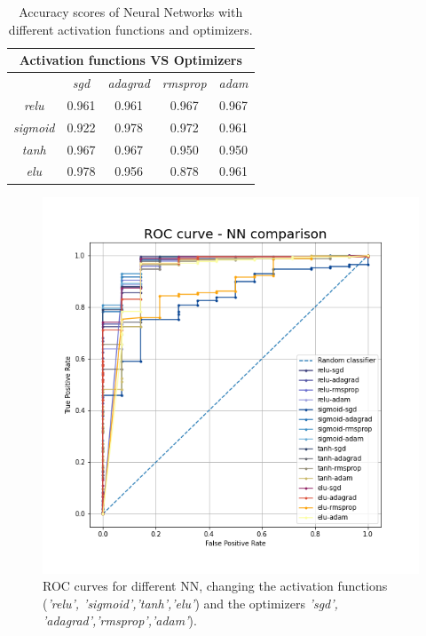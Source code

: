 \documentclass[english,notitlepage,reprint,nofootinbib]{revtex4-1}  %
\begin{document}
\begin{table}[]
\begin{tabular}{ccccc}
\hline
\multicolumn{5}{c}{Activation functions VS Optimizers}                                                     \\ \hline
                                      & \textit{sgd} & \textit{adagrad} & \textit{rmsprop} & \textit{adam} \\ \cline{2-5} 
\multicolumn{1}{c|}{\textit{relu}}    & 0.961        & 0.961            & 0.967            & 0.967         \\
\multicolumn{1}{c|}{\textit{sigmoid}} & 0.922        & 0.978            & 0.972            & 0.961         \\
\multicolumn{1}{c|}{\textit{tanh}}    & 0.967        & 0.967            & 0.950            & 0.950         \\
\multicolumn{1}{c|}{\textit{elu}}     & 0.978        & 0.956            & 0.878            & 0.961        
\end{tabular}
\caption{Accuracy scores of Neural Networks with different activation functions and optimizers.}
\label{tab:nn}
\end{table}

\begin{figure}[h]
    \centering 
    \includegraphics[scale=0.3]{results/ROC_comp_NN.png}
    \caption{ROC curves for different NN, changing the activation functions (\textit{'relu', 'sigmoid','tanh','elu'}) and the optimizers \textit{'sgd', 'adagrad','rmsprop','adam'}).}
    \label{res:roc_nn}
\end{figure}
\end{document}
